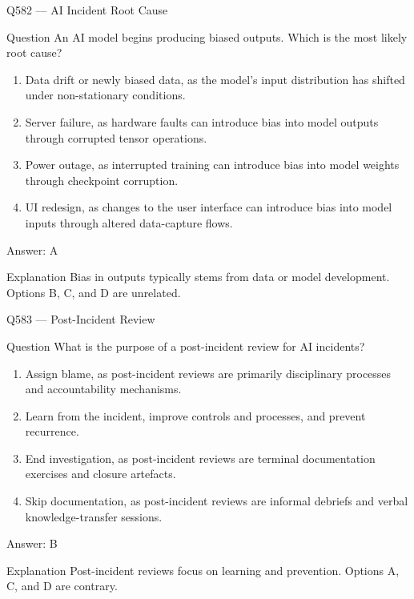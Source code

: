 \documentclass[aspectratio=169,8pt]{beamer}
\begin{document}
	\begin{frame}{Q582 --- AI Incident Root Cause}
		\begin{block}{Question}
			An AI model begins producing biased outputs. Which is the most likely root cause?
			\begin{enumerate}
				\item Data drift or newly biased data, as the model's input distribution has shifted under non-stationary conditions.
				\item Server failure, as hardware faults can introduce bias into model outputs through corrupted tensor operations.
				\item Power outage, as interrupted training can introduce bias into model weights through checkpoint corruption.
				\item UI redesign, as changes to the user interface can introduce bias into model inputs through altered data-capture flows.
			\end{enumerate}
		\end{block}
		\begin{exampleblock}{Answer: A}\end{exampleblock}
		\begin{block}{Explanation}
			Bias in outputs typically stems from data or model development. Options B, C, and D are unrelated.
		\end{block}
	\end{frame}
	
	\begin{frame}{Q583 --- Post-Incident Review}
		\begin{block}{Question}
			What is the purpose of a post-incident review for AI incidents?
			\begin{enumerate}
				\item Assign blame, as post-incident reviews are primarily disciplinary processes and accountability mechanisms.
				\item Learn from the incident, improve controls and processes, and prevent recurrence.
				\item End investigation, as post-incident reviews are terminal documentation exercises and closure artefacts.
				\item Skip documentation, as post-incident reviews are informal debriefs and verbal knowledge-transfer sessions.
			\end{enumerate}
		\end{block}
		\begin{exampleblock}{Answer: B}\end{exampleblock}
		\begin{block}{Explanation}
			Post-incident reviews focus on learning and prevention. Options A, C, and D are contrary.
		\end{block}
	\end{frame}
	
\end{document}
